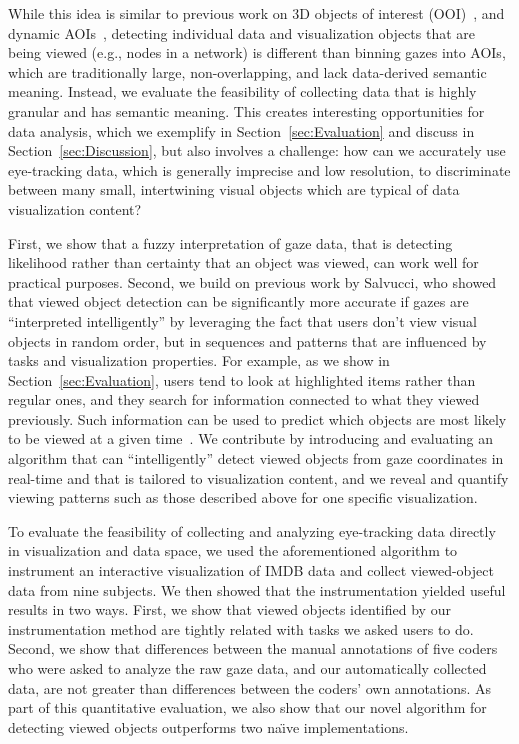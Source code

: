 While this idea is similar to previous work on 3D objects of interest (OOI)~\cite{stellmach20103d}, and  dynamic AOIs~\cite{papenmeier2010dynaoi}, detecting individual data and visualization objects that are being viewed (e.g., nodes in a network) is different than binning gazes into AOIs, which are traditionally large, non-overlapping, and lack data-derived semantic meaning. Instead, we evaluate the feasibility of collecting data that is highly granular and has semantic meaning. This creates interesting opportunities for data analysis, which we exemplify in Section~\ref{sec:Evaluation} and discuss in Section~\ref{sec:Discussion}, but also involves a challenge: how can we accurately use eye-tracking data, which is generally imprecise and low resolution, to discriminate between many small, intertwining visual objects which are typical of data visualization content?  

First, we show that a fuzzy interpretation of gaze data, that is detecting likelihood rather than certainty that an object was viewed, can work well for practical purposes. Second, we build on previous work by Salvucci, who showed that viewed object detection can be significantly more accurate if gazes are ``interpreted intelligently'' by leveraging the fact that users don't view visual objects in random order, but in sequences and patterns that are influenced by tasks and visualization properties. For example, as we show in Section~\ref{sec:Evaluation}, users tend to look at highlighted items rather than regular ones, and they search for information connected to what they viewed previously. Such information can be used to predict which objects are most likely to be viewed at a given time~\cite{salvucci1999inferring, salvucci2000intelligent}. We contribute by introducing and evaluating an algorithm that can ``intelligently'' detect viewed objects from gaze coordinates in real-time and that is tailored to visualization content, and we reveal and quantify viewing patterns such as those described above for one specific visualization.  

To evaluate the feasibility of collecting and analyzing eye-tracking data directly in visualization and data space,  we used the aforementioned algorithm to instrument an interactive visualization of IMDB data and collect viewed-object data from nine subjects. We then showed that the instrumentation yielded useful results in two ways. First, we show that viewed objects identified by our instrumentation method are tightly related with tasks we asked users to do. Second, we show that differences between the manual annotations of five coders who were asked to analyze the raw gaze data, and our automatically collected data, are not greater than differences between the coders' own annotations. As part of this quantitative evaluation, we also show that our novel algorithm for detecting viewed objects outperforms two na\"{\i}ve implementations. 

